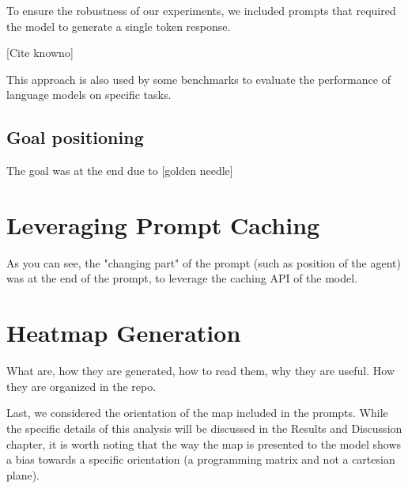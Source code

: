 To ensure the robustness of our experiments, we included prompts that required
the model to generate a single token response.

[Cite knowno]

This approach is also used by some benchmarks to evaluate the performance of language
models on specific tasks.

\subsection{Goal positioning}

The goal was at the end due to [golden needle]

\section{Leveraging Prompt Caching}
As you can see, the "changing part" of the prompt (such as position of the agent)
was at the end of the prompt, to leverage the caching API of the model.

\section{Heatmap Generation}
\label{sec:heatmap_generation}

What are, how they are generated, how to read them, why they are useful. How
they are organized in the repo.

Last, we considered the orientation of the map included in the prompts. While
the specific details of this analysis will be discussed in the Results and
Discussion chapter, it is worth noting that the way the map is presented to the model
shows a bias towards a specific orientation (a programming matrix and not a
cartesian plane).